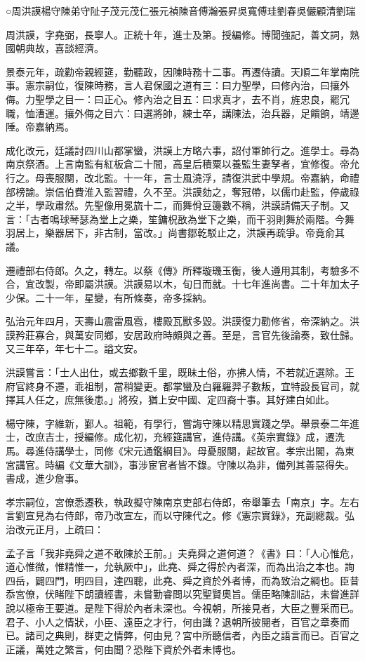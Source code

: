 
\begin{pinyinscope}
○周洪謨楊守陳弟守阯子茂元茂仁張元禎陳音傅瀚張昇吳寬傅珪劉春吳儼顧清劉瑞

周洪謨，字堯弼，長寧人。正統十年，進士及第。授編修。博聞強記，善文詞，熟國朝典故，喜談經濟。

景泰元年，疏勸帝親經筵，勤聽政，因陳時務十二事。再遷侍讀。天順二年掌南院事。憲宗嗣位，復陳時務，言人君保國之道有三：曰力聖學，曰修內治，曰攘外侮。力聖學之目一：曰正心。修內治之目五：曰求真才，去不肖，旌忠良，罷冗職，恤漕運。攘外侮之目六：曰選將帥，練士卒，講陳法，治兵器，足饋餉，靖邊陲。帝嘉納焉。

成化改元，廷議討四川山都掌蠻，洪謨上方略六事，詔付軍帥行之。進學士。尋為南京祭酒。上言南監有紅板倉二十間，高皇后積粟以養監生妻孥者，宜修復。帝允行之。母喪服闋，改北監。十一年，言士風澆浮，請復洪武中學規。帝嘉納，命禮部榜諭。崇信伯費淮入監習禮，久不至。洪謨劾之，奪冠帶，以儒巾赴監，停歲祿之半，學政肅然。先聖像用冕旒十二，而舞佾豆籩數不稱，洪謨請備天子制。又言：「古者鳴球琴瑟為堂上之樂，笙鏞柷敔為堂下之樂，而干羽則舞於兩階。今舞羽居上，樂器居下，非古制，當改。」尚書鄒乾駁止之，洪謨再疏爭。帝竟俞其議。

遷禮部右侍郎。久之，轉左。以蔡《傳》所釋璇璣玉衡，後人遵用其制，考驗多不合，宜改製，帝即屬洪謨。洪謨易以木，旬日而就。十七年進尚書。二十年加太子少保。二十一年，星變，有所條奏，帝多採納。

弘治元年四月，天壽山震雷風雹，樓殿瓦獸多毀。洪謨復力勸修省，帝深納之。洪謨矜莊寡合，與萬安同鄉，安居政府時頗與之善。至是，言官先後論奏，致仕歸。又三年卒，年七十二。謚文安。

洪謨嘗言：「士人出仕，或去鄉數千里，既昧土俗，亦拂人情，不若就近選除。王府官終身不遷，乖祖制，當稍變更。都掌蠻及白羅羅羿子數叛，宜特設長官司，就擇其人任之，庶無後患。」將歿，猶上安中國、定四裔十事。其好建白如此。

楊守陳，字維新，鄞人。祖範，有學行，嘗誨守陳以精思實踐之學。舉景泰二年進士，改庶吉士，授編修。成化初，充經筵講官，進侍講。《英宗實錄》成，遷洗馬。尋進侍講學士，同修《宋元通鑑綱目》。母憂服闋，起故官。孝宗出閣，為東宮講官。時編《文華大訓》，事涉宦官者皆不錄。守陳以為非，備列其善惡得失。書成，進少詹事。

孝宗嗣位，宮僚悉遷秩，執政擬守陳南京吏部右侍郎，帝舉筆去「南京」字。左右言劉宣見為右侍郎，帝乃改宣左，而以守陳代之。修《憲宗實錄》，充副總裁。弘治改元正月，上疏曰：

孟子言「我非堯舜之道不敢陳於王前。」夫堯舜之道何道？《書》曰：「人心惟危，道心惟微，惟精惟一，允執厥中」，此堯、舜之得於內者深，而為出治之本也。詢四岳，闢四門，明四目，達四聰，此堯、舜之資於外者博，而為致治之綱也。臣昔忝宮僚，伏睹陛下朗讀經書，未嘗勤睿問以究聖賢奧旨。儒臣略陳訓詁，未嘗進詳說以極帝王要道。是陛下得於內者未深也。今視朝，所接見者，大臣之豐采而已。君子、小人之情狀，小臣、遠臣之才行，何由識？退朝所披閱者，百官之章奏而已。諸司之典則，群吏之情弊，何由見？宮中所聽信者，內臣之語言而已。百官之正議，萬姓之繁言，何由聞？恐陛下資於外者未博也。


\end{pinyinscope}
